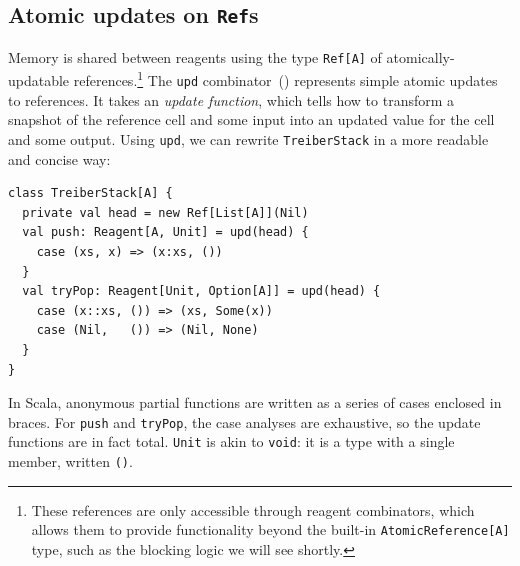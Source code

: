 \documentclass[preprint,nocopyrightspace]{sigplanconf}
\begin{document}




\subsection{Atomic updates on \lstinline{Ref}s}

Memory is shared between reagents using the type \lstinline{Ref[A]} of
atomically-updatable references.\footnote{ These references are only
  accessible through reagent combinators, which allows them to provide
  functionality beyond the built-in \lstinline{AtomicReference[A]} type, such
  as the blocking logic we will see shortly.  }
The \lstinline{upd} combinator~() represents simple atomic
updates to references.  It takes an \emph{update function}, which tells how to
transform a snapshot of the reference cell and some input into an updated
value for the cell and some output.  Using \lstinline{upd}, we can rewrite
\lstinline{TreiberStack} in a more readable and concise way:
\begin{lstlisting}
class TreiberStack[A] {
  private val head = new Ref[List[A]](Nil)
  val push: Reagent[A, Unit] = upd(head) {
    case (xs, x) => (x:xs, ())
  }
  val tryPop: Reagent[Unit, Option[A]] = upd(head) {
    case (x::xs, ()) => (xs, Some(x))
    case (Nil,   ()) => (Nil, None)
  }
}
\end{lstlisting}
In Scala, anonymous partial functions are written as a series of cases
enclosed in braces.  For \lstinline{push} and \lstinline{tryPop}, the case
analyses are exhaustive, so the update functions are in fact total.
\lstinline{Unit} is akin to \lstinline{void}: it is a type with a single
member, written \lstinline{()}.
\end{document}
